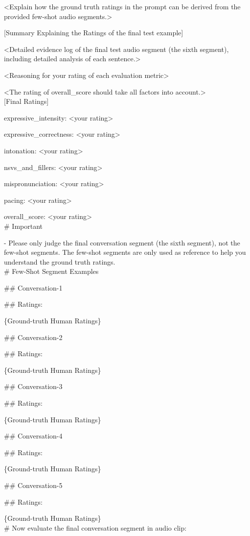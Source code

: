\begin{tcolorbox}[gray_box, title = {{Prompt Template: Few-shot Speech Prompting}}]
<Explain how the ground truth ratings in the prompt can be derived from the provided few-shot audio segments.>

[Summary Explaining the Ratings of the final test example]

<Detailed evidence log of the final test audio segment (the sixth segment), including detailed analysis of each sentence.>

<Reasoning for your rating of each evaluation metric>

<The rating of overall_score should take all factors into account.> \\

[Final Ratings]

expressive_intensity: <your rating>

expressive_correctness: <your rating>

intonation: <your rating>

nsvs_and_fillers: <your rating>

mispronunciation: <your rating>

pacing: <your rating>

overall_score: <your rating> \\

\# Important

- Please only judge the final conversation segment (the sixth segment), not the few-shot segments. The few-shot segments are only used as reference to help you understand the ground truth ratings. \\

\# Few-Shot Segment Examples

\#\# Conversation-1

\#\# Ratings:

\{Ground-truth Human Ratings\}

\#\# Conversation-2

\#\# Ratings:

\{Ground-truth Human Ratings\}

\#\# Conversation-3

\#\# Ratings:

\{Ground-truth Human Ratings\}

\#\# Conversation-4

\#\# Ratings:

\{Ground-truth Human Ratings\}

\#\# Conversation-5

\#\# Ratings:

\{Ground-truth Human Ratings\} \\

\# Now evaluate the final conversation segment in audio clip:
\end{tcolorbox}